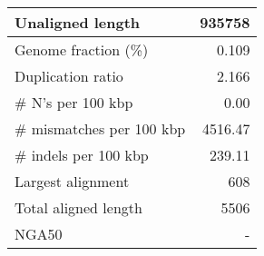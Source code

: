 \documentclass[12pt,a4paper]{article}
\begin{document}
\begin{table}[ht]
\begin{center}
\begin{tabular}{|l*{1}{|r}|}
Unaligned length & 935758 \\ \hline
Genome fraction (\%) & 0.109 \\ \hline
Duplication ratio & 2.166 \\ \hline
\# N's per 100 kbp & 0.00 \\ \hline
\# mismatches per 100 kbp & 4516.47 \\ \hline
\# indels per 100 kbp & 239.11 \\ \hline
Largest alignment & 608 \\ \hline
Total aligned length & 5506 \\ \hline
NGA50 & - \\ \hline
\end{tabular}
\end{center}
\end{table}
\end{document}
